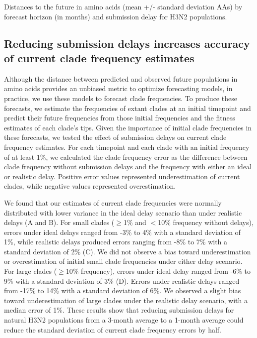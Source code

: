 \documentclass[9pt,lineno]{elife}
\begin{document}
\begin{table}[htb]
  \begin{center}
    
    \caption{Distances to the future in amino acids (mean +/- standard deviation AAs) by forecast horizon (in months) and submission delay for H3N2 populations.}
    \label{tab:h3n2_distances_to_the_future}
  \end{center}
\end{table}

\subsection{Reducing submission delays increases accuracy of current clade frequency estimates}

Although the distance between predicted and observed future populations in amino acids provides an unbiased metric to optimize forecasting models, in practice, we use these models to forecast clade frequencies.
To produce these forecasts, we estimate the frequencies of extant clades at an initial timepoint and predict their future frequencies from those initial frequencies and the fitness estimates of each clade's tips.
Given the importance of initial clade frequencies in these forecasts, we tested the effect of submission delays on current clade frequency estimates.
For each timepoint and each clade with an initial frequency of at least 1\%, we calculated the clade frequency error as the difference between clade frequency without submission delays and the frequency with either an ideal or realistic delay.
Positive error values represented underestimation of current clades, while negative values represented overestimation.

We found that our estimates of current clade frequencies were normally distributed with lower variance in the ideal delay scenario than under realistic delays (A and B).
For small clades ($\ge$1\% and $<$10\% frequency without delays), errors under ideal delays ranged from -3\% to 4\% with a standard deviation of 1\%, while realistic delays produced errors ranging from -8\% to 7\% with a standard deviation of 2\% (C).
We did not observe a bias toward underestimation or overestimation of initial small clade frequencies under either delay scenario.
For large clades ($\ge$10\% frequency), errors under ideal delay ranged from -6\% to 9\% with a standard deviation of 3\% (D).
Errors under realistic delays ranged from -17\% to 14\% with a standard deviation of 6\%.
We observed a slight bias toward underestimation of large clades under the realistic delay scenario, with a median error of 1\%.
These results show that reducing submission delays for natural H3N2 populations from a 3-month average to a 1-month average could reduce the standard deviation of current clade frequency errors by half.
\end{document}
